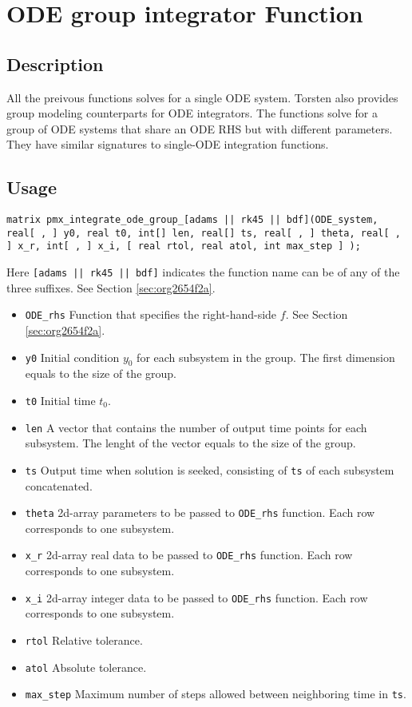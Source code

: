 \documentclass[12pt, reqno, oneside]{amsbook}
\numberwithin{equation}{chapter}
\numberwithin{figure}{chapter}
\numberwithin{table}{chapter}
\theoremstyle{remark}
\begin{document}
\section{ODE group integrator Function}
\label{sec:orge34552c}
\subsection{Description}
\label{sec:org1905897}
All the preivous functions solves for a single ODE system. Torsten also
provides group modeling counterparts for ODE integrators. The
functions solve for a group of ODE systems that share an ODE RHS but with
different parameters. They have similar
signatures to single-ODE integration functions.
\subsection{Usage}
\label{sec:orgdd1fe48}
\begin{verbatim}
matrix pmx_integrate_ode_group_[adams || rk45 || bdf](ODE_system, real[ , ] y0, real t0, int[] len, real[] ts, real[ , ] theta, real[ , ] x_r, int[ , ] x_i, [ real rtol, real atol, int max_step ] );
\end{verbatim}
Here \texttt{[adams || rk45 || bdf]} indicates the
function name can be of any of the three suffixes. See Section \ref{sec:org2654f2a}.
\begin{itemize}
\item \texttt{ODE\_rhs}
Function that specifies the right-hand-side \(f\). See Section \ref{sec:org2654f2a}.
\item \texttt{y0}
Initial condition \(y_0\) for each subsystem in the group. The
first dimension equals to the size of the group.
\item \texttt{t0}
Initial time \(t_0\).
\item \texttt{len}
A vector that contains the number of output time points for each
subsystem. The lenght of the vector equals to the size of the group.
\item \texttt{ts}
Output time when solution is seeked, consisting of
\texttt{ts} of each subsystem concatenated.
\item \texttt{theta}
2d-array parameters to be passed to \texttt{ODE\_rhs}
function. Each row corresponds to one subsystem.
\item \texttt{x\_r}
2d-array real data to be passed to \texttt{ODE\_rhs} function.
Each row corresponds to one subsystem.
\item \texttt{x\_i}
2d-array integer data to be passed to \texttt{ODE\_rhs} function.
Each row corresponds to one subsystem.
\item \texttt{rtol}
Relative tolerance.
\item \texttt{atol}
Absolute tolerance.
\item \texttt{max\_step}
Maximum number of steps allowed between neighboring time in \texttt{ts}.
\end{itemize}
\end{document}
